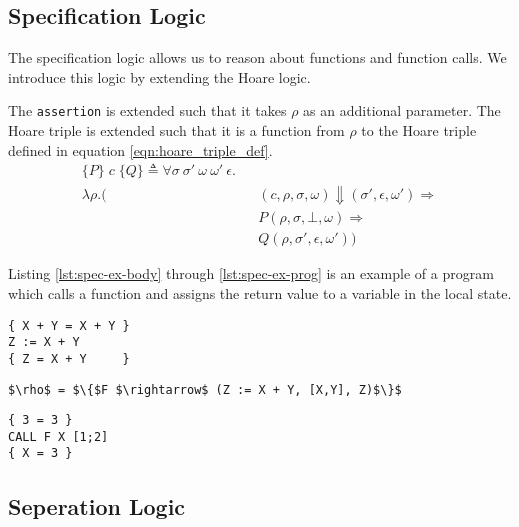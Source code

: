 \subsection{Specification Logic}
The specification logic allows us to reason about functions and function calls. We introduce this logic by extending the Hoare logic.

The \verb|assertion| is extended such that it takes $\rho$ as an additional parameter. The Hoare triple is extended such that it is a function from $\rho$ to the Hoare triple defined in equation \ref{eqn:hoare_triple_def}.
\begin{equation}
\begin{alignedat}{2}
\{P\}\;c\;\{Q\} \triangleq \forall \sigma \: \sigma' \: \omega \: \omega' \: \epsilon .\\
 \lambda\rho.(
  && (c,\rho,\sigma,\omega) \Downarrow (\sigma', \epsilon, \omega') \Rightarrow\\
&& P(\rho,\sigma,\bot,\omega) \Rightarrow\\
&& Q(\rho,\sigma',\epsilon,\omega'))
\end{alignedat}
\end{equation}

Listing \ref{lst:spec-ex-body} through \ref{lst:spec-ex-prog} is an example of a program which calls a function and assigns the return value to a variable in the local state.

\begin{lstlisting}[mathescape=true,keepspaces=true,label=lst:spec-ex-body,caption=The body of the function F]
{ X + Y = X + Y }
Z := X + Y
{ Z = X + Y     }
\end{lstlisting}

\begin{lstlisting}[mathescape=true,keepspaces=true,label=lst:spec-ex-env,caption=A partial function space containing the function F.]
$\rho$ = $\{$F $\rightarrow$ (Z := X + Y, [X,Y], Z)$\}$
\end{lstlisting}

\begin{lstlisting}[mathescape=true,keepspaces=true,label=lst:spec-ex-prog,caption=A program which call the function F and stores the result in X]
{ 3 = 3 }
CALL F X [1;2]
{ X = 3 }
\end{lstlisting}

\subsection{Seperation Logic}
